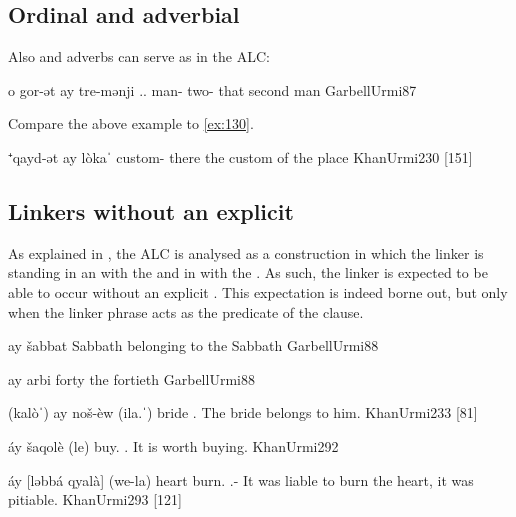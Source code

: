\clearpage 
\subsection{Ordinal and adverbial \secns}

 Also  and adverbs can serve as \secns in the ALC:

{o gor-ət ay tre-mənji}
{\dem.\far.\masc{} man-\cst{} \lnk{} two-\ord}
{that second man}
{GarbellUrmi}{87}

Compare the above example to \vref{ex:130}.

{⁺qayd-ət ay\cb{} lòkaˈ}
{custom-\cst{} \lnk\cb{}\footnotemark{} there}
{the custom of the place}
{KhanUrmi}{230 {[151]}}


\subsection{Linkers without an explicit \prim} \label{ss:JUrm_lnk_noPrim}

As explained in , the ALC is analysed as a construction in which the linker is standing in an   with the \secn and in   with the \prim. As such, the linker is expected to be able to occur without an explicit \prim. This expectation is indeed borne out, but only when the linker phrase acts as the predicate of the clause.

{ay šabbat}
{\lnk{} Sabbath}
{belonging to the Sabbath}
{GarbellUrmi}{88}

{ay arbi}
{\lnk{} forty}
{the fortieth}
{GarbellUrmi}{88}

{(kalòˈ) ay\cb{} noš-èw (\cb{}ila.ˈ)}
{bride \lnk\cb{} \masc{} \cb{}\cop.\fem}
{The bride belongs to him.}
{KhanUrmi}{233 {[81]}}

{áy šaqolè (\cb{}le)}
{\lnk{} buy.\inf{} \cb{}\cop.\masc}
{It is worth buying.}
{KhanUrmi}{292}

{áy [ləbbá qyalà] (\cb{}we-la)}
{\lnk{} heart burn.\inf{} \cb{}\cop.\pst-\fem}
{It was liable to burn the heart, it was pitiable.}
{KhanUrmi}{293 {[121]}}

